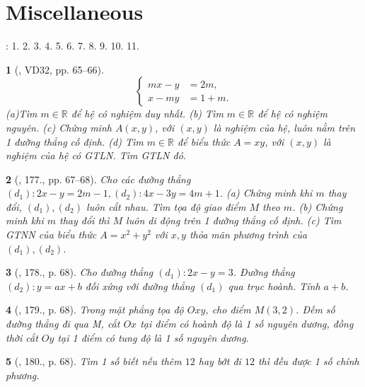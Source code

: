 \documentclass{article}
\newtheorem{baitoan}{}
\begin{document}

\section{Miscellaneous}
\cite[BTCCI, pp. 26--27]{SGK_Toan_9_Canh_Dieu_tap_1}: 1. 2. 3. 4. 5. 6. 7. 8. 9. 10. 11.

\begin{baitoan}[\cite{Tuyen_Toan_9_old}, VD32, pp. 65--66]
	\begin{equation*}
		\left\{\begin{split}
			mx - y &= 2m,\\
			x - my &= 1 + m.
		\end{split}\right.
	\end{equation*}
	(a)Tìm $m\in\mathbb{R}$ để hệ có nghiệm duy nhất. (b) Tìm $m\in\mathbb{R}$ để hệ có nghiệm nguyên. (c) Chứng minh $A(x,y)$, với $(x,y)$ là nghiệm của hệ, luôn nằm trên 1 đường thẳng cố định. (d) Tìm $m\in\mathbb{R}$ để biểu thức $A = xy$, với $(x,y)$ là nghiệm của hệ  có {\rm GTLN}. Tìm {\rm GTLN} đó.
\end{baitoan}

\begin{baitoan}[\cite{Tuyen_Toan_9_old}, 177., pp. 67--68]
	Cho các đường thẳng $(d_1):2x - y = 2m - 1,(d_2):4x - 3y = 4m + 1$. (a) Chứng minh khi $m$ thay đổi, $(d_1),(d_2)$ luôn cắt nhau. Tìm tọa độ giao điểm $M$ theo $m$. (b) Chứng minh khi $m$ thay đổi thì $M$ luôn di động trên 1 đường thẳng cố định. (c) Tìm {\rm GTNN} của biểu thức $A = x^2 + y^2$ với $x,y$ thỏa mãn phương trình của $(d_1),(d_2)$.
\end{baitoan}

\begin{baitoan}[\cite{Tuyen_Toan_9_old}, 178., p. 68]
	Cho đường thẳng $(d_1):2x - y = 3$. Đường thẳng $(d_2):y = ax + b$ đối xứng với đường thẳng $(d_1)$ qua trục hoành. Tính $a + b$.
\end{baitoan}

\begin{baitoan}[\cite{Tuyen_Toan_9_old}, 179., p. 68]
	Trong mặt phẳng tọa độ $Oxy$, cho điểm $M(3,2)$. Đếm số đường thẳng đi qua M, cắt $Ox$ tại điểm có hoành độ là 1 số nguyên dương, đồng thời cắt $Oy$ tại 1 điểm có tung độ là 1 số nguyên dương.
\end{baitoan}

\begin{baitoan}[\cite{Tuyen_Toan_9_old}, 180., p. 68]
	Tìm 1 số biết nếu thêm $12$ hay bớt đi $12$ thì đều được 1 số chính phương.
\end{baitoan}
\end{document}
